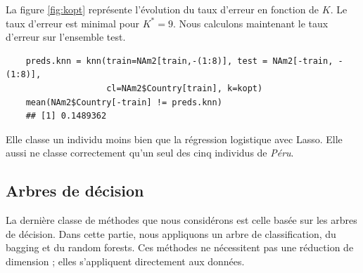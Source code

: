 \documentclass[12pt,a4paper]{article}
\begin{document}
La figure \ref{fig:kopt} représente l'évolution du taux d'erreur en fonction de $K$. Le taux d'erreur est minimal pour $K^* = 9$. Nous calculons maintenant le taux d'erreur sur l'ensemble test.\vspace{2mm}
\begin{lstlisting}
	preds.knn = knn(train=NAm2[train,-(1:8)], test = NAm2[-train, -(1:8)],
	                cl=NAm2$Country[train], k=kopt)
	mean(NAm2$Country[-train] != preds.knn)
	## [1] 0.1489362
\end{lstlisting}
Elle classe un individu moins bien que la régression logistique avec Lasso. Elle aussi ne classe correctement qu'un seul des cinq individus de \textit{Péru}.
\subsection{Arbres de décision}
La dernière classe de méthodes que nous considérons est celle basée sur les arbres de décision. Dans cette partie, nous appliquons un arbre de classification, du bagging et du random forests. Ces méthodes ne nécessitent pas une réduction de dimension ; elles s'appliquent directement aux données.
\end{document}
